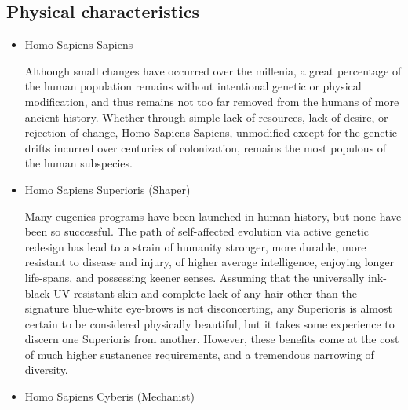 \subsection{Physical characteristics}
\begin{itemize}
\item Homo Sapiens Sapiens

Although small changes have occurred over the millenia, a great
percentage of the human population remains without intentional genetic
or physical modification, and thus remains not too far removed from
the humans of more ancient history. Whether through simple lack of
resources, lack of desire, or rejection of change, Homo Sapiens
Sapiens, unmodified except for the genetic drifts incurred over
centuries of colonization, remains the most populous of the human
subspecies.

\item Homo Sapiens Superioris (Shaper)

Many eugenics programs have been launched in human history, but none
have been so successful. The path of self-affected evolution via
active genetic redesign has lead to a strain of humanity stronger,
more durable, more resistant to disease and injury, of higher average
intelligence, enjoying longer life-spans, and possessing keener
senses.  Assuming that the universally ink-black UV-resistant skin and
complete lack of any hair other than the signature blue-white
eye-brows is not disconcerting, any Superioris is almost certain to be
considered physically beautiful, but it takes some experience to
discern one Superioris from another. However, these benefits come at
the cost of much higher sustanence requirements, and a tremendous
narrowing of diversity.

\item Homo Sapiens Cyberis (Mechanist)


\end{itemize}
